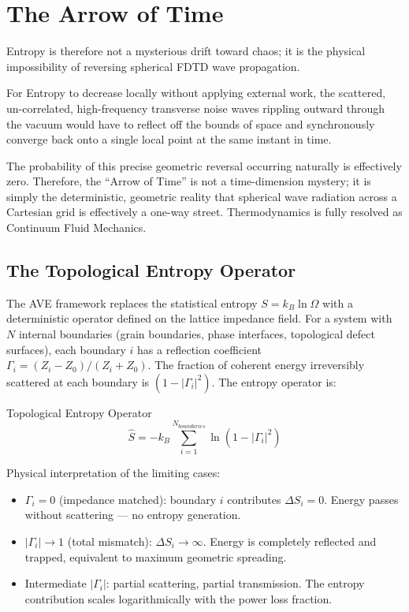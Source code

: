 \section{The Arrow of Time}
Entropy is therefore not a mysterious drift toward chaos; it is the physical impossibility of reversing spherical FDTD wave propagation.

For Entropy to decrease locally without applying external work, the scattered, un-correlated, high-frequency transverse noise waves rippling outward through the vacuum would have to reflect off the bounds of space and synchronously converge back onto a single local point at the same instant in time. 

The probability of this precise geometric reversal occurring naturally is effectively zero. Therefore, the ``Arrow of Time'' is not a time-dimension mystery; it is simply the deterministic, geometric reality that spherical wave radiation across a Cartesian grid is effectively a one-way street. Thermodynamics is fully resolved as Continuum Fluid Mechanics.

\subsection{The Topological Entropy Operator}
\label{sec:entropy_operator}

The AVE framework replaces the statistical entropy $S = k_B \ln \Omega$ with a deterministic operator defined on the lattice impedance field. For a system with $N$ internal boundaries (grain boundaries, phase interfaces, topological defect surfaces), each boundary $i$ has a reflection coefficient $\Gamma_i = (Z_i - Z_0)/(Z_i + Z_0)$. The fraction of coherent energy irreversibly scattered at each boundary is $(1 - |\Gamma_i|^2)$. The entropy operator is:
\begin{resultbox}{Topological Entropy Operator}
\begin{equation}
    \hat{S} = -k_B \sum_{i=1}^{N_{boundaries}} \ln\left(1 - |\Gamma_i|^2\right)
    \label{eq:entropy_operator}
\end{equation}
\end{resultbox}

\noindent Physical interpretation of the limiting cases:
\begin{itemize}
    \item $\Gamma_i = 0$ (impedance matched): boundary $i$ contributes $\Delta S_i = 0$. Energy passes without scattering --- no entropy generation.
    \item $|\Gamma_i| \to 1$ (total mismatch): $\Delta S_i \to \infty$. Energy is completely reflected and trapped, equivalent to maximum geometric spreading.
    \item Intermediate $|\Gamma_i|$: partial scattering, partial transmission. The entropy contribution scales logarithmically with the power loss fraction.
\end{itemize}

